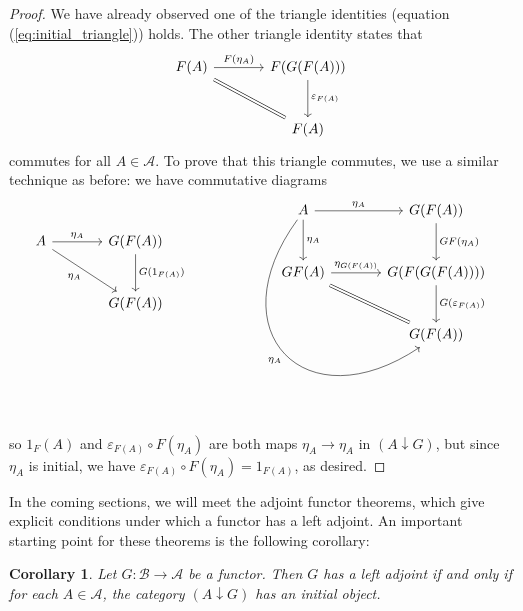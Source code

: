 \documentclass[10pt,oneside]{book}
\def\~#1{\mathscr{#1}}
\newcommand{\ve}{\varepsilon}
\theoremstyle{plain}
\newtheorem{cor}[thm]{Corollary}
\theoremstyle{definition}
\theoremstyle{remark}
\numberwithin{equation}{section}
\numberwithin{figure}{section}
\begin{document}
\begin{proof}
We have already observed one of the triangle identities (equation (\ref{eq:initial_triangle})) holds. The other triangle identity states that
\[\begin{tikzcd}[column sep = large, row sep = large]
    F(A) & F(G(F(A))) \\
    & F(A)
    \arrow["{F(\eta_A)}", from=1-1, to=1-2]
    \arrow[Rightarrow, no head, from=1-1, to=2-2]
    \arrow["\ve_{F(A)}", from=1-2, to=2-2]
\end{tikzcd}\]
commutes for all $A \in \~A$. To prove that this triangle commutes, we use a similar technique as before: we have commutative diagrams 
\[\begin{tikzcd}[column sep = large, row sep = large]
    A & {G(F(A))} \\
    & {G(F(A))}
    \arrow["{\eta_A}", from=1-1, to=1-2]
    \arrow["{\eta_A}"', from=1-1, to=2-2]
    \arrow["{G(1_{F(A)})}", from=1-2, to=2-2]
\end{tikzcd} \qquad  \begin{tikzcd}[row sep = large, column sep = scriptsize]
    A && {G(F(A))} \\
    {GF(A)} && {G(F(G(F(A))))} \\
    && {G(F(A))}
    \arrow["{\eta_A}", from=1-1, to=1-3]
    \arrow["{\eta_A}", from=1-1, to=2-1]
    \arrow["{\eta_A}"', bend right = 80, looseness = 2, from=1-1, to=3-3]
    \arrow["{GF(\eta_A)}", from=1-3, to=2-3]
    \arrow["{\eta_{G(F(A))}}", from=2-1, to=2-3]
    \arrow[Rightarrow, no head, from=2-1, to=3-3]
    \arrow["{G(\ve_{F(A)})}", from=2-3, to=3-3]
\end{tikzcd}\]
so $1_F(A)$ and $\ve_{F(A)} \circ F(\eta_{A})$ are both maps $\eta_A \to \eta_A$ in $(A \downarrow G)$, but since $\eta_A$ is initial, we have $\ve_{F(A)} \circ F(\eta_A) = 1_{F(A)}$, as desired.
\end{proof}

In the coming sections, we will meet the adjoint functor theorems, which give explicit conditions under which a functor has a left adjoint. An important starting point for these theorems is the following corollary:

\begin{cor}
    Let $G: \~B \to \~A$ be a functor. Then $G$ has a left adjoint if and only if for each $A \in \~A$, the category $(A \downarrow G)$ has an initial object.
\end{cor}
\end{document}
